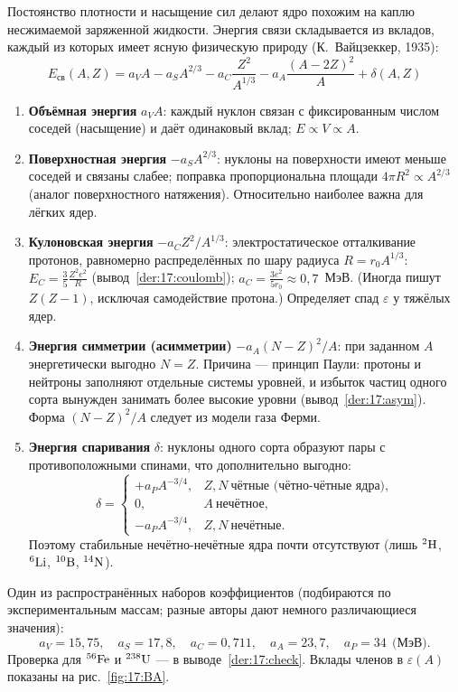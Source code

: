 Постоянство плотности и насыщение сил делают ядро похожим на каплю несжимаемой заряженной жидкости. Энергия связи
складывается из вкладов, каждый из которых имеет ясную физическую природу (К.~Вайцзеккер, 1935):
\begin{equation}\label{eq:17:SEMF}
  \boxed{E_{\text{св}}(A,Z)=a_VA-a_SA^{2/3}-a_C\frac{Z^2}{A^{1/3}}-a_A\frac{(A-2Z)^2}{A}+\delta(A,Z)}
\end{equation}
\begin{enumerate}
 \item \textbf{Объёмная энергия} $a_VA$: каждый нуклон связан с фиксированным числом соседей (насыщение) и даёт
       одинаковый вклад; $E\propto V\propto A$.
 \item \textbf{Поверхностная энергия} $-a_SA^{2/3}$: нуклоны на поверхности имеют меньше соседей и связаны слабее; поправка
       пропорциональна площади $4\pi R^2\propto A^{2/3}$ (аналог поверхностного натяжения). Относительно наиболее важна для лёгких ядер.
 \item \textbf{Кулоновская энергия} $-a_CZ^2/A^{1/3}$: электростатическое отталкивание протонов, равномерно распределённых по шару
       радиуса $R=r_0A^{1/3}$: $E_C=\frac35\frac{Z^2e^2}{R}$ (вывод~\ref{der:17:coulomb}); $a_C=\frac{3e^2}{5r_0}\approx0{,}7$~МэВ. (Иногда пишут
       $Z(Z-1)$, исключая самодействие протона.) Определяет спад $\varepsilon$ у тяжёлых ядер.
 \item \textbf{Энергия симметрии (асимметрии)} $-a_A(N-Z)^2/A$: при заданном $A$ энергетически выгодно $N=Z$. Причина —
       принцип Паули: протоны и нейтроны заполняют отдельные системы уровней, и избыток частиц одного сорта
       вынужден занимать более высокие уровни (вывод~\ref{der:17:asym}). Форма $(N-Z)^2/A$ следует из модели газа Ферми.
 \item \textbf{Энергия спаривания} $\delta$: нуклоны одного сорта образуют пары с противоположными спинами, что дополнительно
       выгодно:
       \[
         \delta=\begin{cases}+a_PA^{-3/4}, & Z,N\ \text{чётные (чётно-чётные ядра)},\\ 0, & A\ \text{нечётное},\\ -a_PA^{-3/4}, & Z,N\ \text{нечётные}.\end{cases}
       \]
       Поэтому стабильные нечётно-нечётные ядра почти отсутствуют (лишь $\nucl{H}{2}$, $\nucl{Li}{6}$, $\nucl{B}{10}$, $\nucl{N}{14}$).
\end{enumerate}
Один из распространённых наборов коэффициентов (подбираются по экспериментальным массам; разные авторы дают немного
различающиеся значения):
\begin{equation}\label{eq:17:coef}
  a_V=15{,}75,\quad a_S=17{,}8,\quad a_C=0{,}711,\quad a_A=23{,}7,\quad a_P=34\ \ \text{(МэВ)}.
\end{equation}
Проверка для $\nucl{Fe}{56}$ и $\nucl{U}{238}$ — в выводе~\ref{der:17:check}. Вклады членов в $\varepsilon(A)$ показаны на рис.~\ref{fig:17:BA}.

